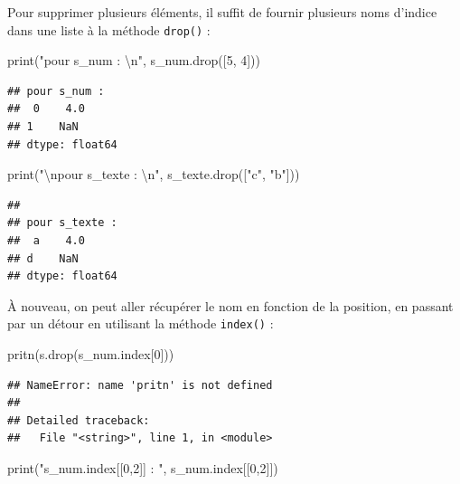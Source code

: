 \documentclass[12pt,]{book}
\newenvironment{Shaded}{\begin{snugshade}}{\end{snugshade}}
\newcommand{\DecValTok}[1]{\textcolor[rgb]{0.00,0.00,0.81}{#1}}
\newcommand{\CharTok}[1]{\textcolor[rgb]{0.31,0.60,0.02}{#1}}
\newcommand{\StringTok}[1]{\textcolor[rgb]{0.31,0.60,0.02}{#1}}
\newcommand{\BuiltInTok}[1]{#1}
\newcommand{\NormalTok}[1]{#1}
\numberwithin{equation}{section}
\numberwithin{countremarque}{section}
\begin{document}
Pour supprimer plusieurs éléments, il suffit de fournir plusieurs noms
d'indice dans une liste à la méthode \texttt{drop()} :

\begin{Shaded}
\begin{Highlighting}[]
\BuiltInTok{print}\NormalTok{(}\StringTok{"pour s_num : }\CharTok{\textbackslash{}n}\StringTok{"}\NormalTok{, s_num.drop([}\DecValTok{5}\NormalTok{, }\DecValTok{4}\NormalTok{]))}
\end{Highlighting}
\end{Shaded}

\begin{lstlisting}
## pour s_num : 
##  0    4.0
## 1    NaN
## dtype: float64
\end{lstlisting}

\begin{Shaded}
\begin{Highlighting}[]
\BuiltInTok{print}\NormalTok{(}\StringTok{"}\CharTok{\textbackslash{}n}\StringTok{pour s_texte : }\CharTok{\textbackslash{}n}\StringTok{"}\NormalTok{, s_texte.drop([}\StringTok{"c"}\NormalTok{, }\StringTok{"b"}\NormalTok{]))}
\end{Highlighting}
\end{Shaded}

\begin{lstlisting}
## 
## pour s_texte : 
##  a    4.0
## d    NaN
## dtype: float64
\end{lstlisting}

À nouveau, on peut aller récupérer le nom en fonction de la position, en
passant par un détour en utilisant la méthode \texttt{index()} :

\begin{Shaded}
\begin{Highlighting}[]
\NormalTok{pritn(s.drop(s_num.index[}\DecValTok{0}\NormalTok{]))}
\end{Highlighting}
\end{Shaded}

\begin{lstlisting}
## NameError: name 'pritn' is not defined
## 
## Detailed traceback: 
##   File "<string>", line 1, in <module>
\end{lstlisting}

\begin{Shaded}
\begin{Highlighting}[]
\BuiltInTok{print}\NormalTok{(}\StringTok{"s_num.index[[0,2]] : "}\NormalTok{, s_num.index[[}\DecValTok{0}\NormalTok{,}\DecValTok{2}\NormalTok{]])}
\end{Highlighting}
\end{Shaded}
\end{document}
